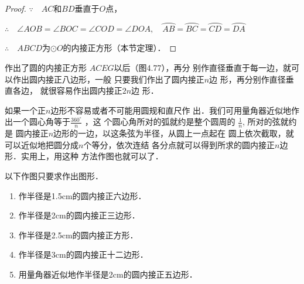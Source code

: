 \begin{proof}
 $\because\quad AC$和$BD$垂直于$O$点，

$\therefore\quad \angle AOB=\angle BOC=\angle COD=\angle DOA,\quad 
  \wideparen{AB}=\wideparen{BC}=\wideparen{CD}=\wideparen{DA}$

  $\therefore\quad ABCD$为$\odot O$的内接正方形（本节定理）．
\end{proof}

\begin{figure}[htp]\centering
  \begin{minipage}[t]{0.48\textwidth}
  \centering
{}
  \caption{}
  \end{minipage}
  \begin{minipage}[t]{0.48\textwidth}
  \centering
  \caption{}
  \end{minipage}
  \end{figure}

  作出了圆的内接正方形
  $ACEG$以后（图4.77），再分
  别作直径垂直于每一边，就可
  以作出圆内接正八边形，一般
  只要我们作出了圆内接正$n$边
  形，再分别作直径垂直各边，
  就很容易作出圆内接正$2n$边
  形．

  如果一个正$n$边形不容易或者不可能用圆规和直尺作
  出．我们可用量角器近似地作出一个圆心角等于$\frac{360^{\circ}}{n}$
  ，这
  个圆心角所对的弧就约是整个圆周的
  $\frac{1}{n}$, 所对的弦就约是
  圆内接正$n$边形的一边，以这条弦为半径，从圆上一点起在
  圆上依次截取，就可以近似地把圆分成$n$个等分，依次连结
  各分点就可以得到所求的圆内接正$n$边形．实用上，用这种
  方法作图也就可以了．

\begin{ex}
  以下作图只要求作出图形．
  \begin{enumerate}
    \item 作半径是1.5cm的圆内接正六边形．
    \item 作半径是2cm的圆内接正三边形．
    \item 作半径是2.5cm的圆内接正方形．
    \item 作半径是3cm的圆内接正十二边形．
    \item 用量角器近似地作半径是2cm的圆内接正五边形．
  \end{enumerate}
\end{ex}

